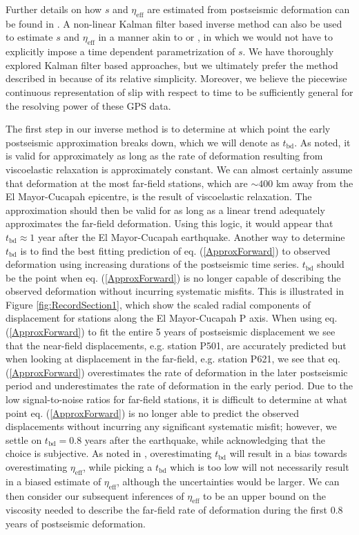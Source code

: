 \documentclass[1p]{elsarticle}
\begin{document}
Further details on how $s$ and $\eta_\mathrm{eff}$ are estimated from postseismic deformation can be found in \citet{Hines2015}. A non-linear Kalman filter based inverse method can also be used to estimate $s$ and $\eta_{\mathrm{eff}}$ in a manner akin to \citet{Segall1997} or \citet{McGuire2003}, in which we would not have to explicitly impose a time dependent parametrization of $s$. We have thoroughly explored Kalman filter based approaches, but we ultimately prefer the method described in \citet{Hines2015} because of its relative simplicity. Moreover, we believe the piecewise continuous representation of slip with respect to time to be sufficiently general for the resolving power of these GPS data.

The first step in our inverse method is to determine at which point the early postseismic approximation breaks down, which we will denote as $t_{\mathrm{bd}}$.  As noted, it is valid for approximately as long as the rate of deformation resulting from viscoelastic relaxation is approximately constant. We can almost certainly assume that deformation at the most far-field stations, which are $\sim400$ km away from the El Mayor-Cucapah epicentre, is the result of viscoelastic relaxation. The approximation should then be valid for as long as a linear trend adequately approximates the far-field deformation. Using this logic, it would appear that $t_{\mathrm{bd}}\approx1$ year after the El Mayor-Cucapah earthquake.  Another way to determine $t_{\mathrm{bd}}$ is to find the best fitting prediction of eq. (\ref{ApproxForward}) to observed deformation using increasing durations of the postseismic time series.  $t_\mathrm{bd}$ should be the point when eq. (\ref{ApproxForward}) is no longer capable of describing the observed deformation without incurring systematic misfits.  This is illustrated in Figure \ref{fig:RecordSection1}, which show the scaled radial components of displacement for stations along the El Mayor-Cucapah P axis.  When using eq. (\ref{ApproxForward}) to fit the entire 5 years of postseismic displacement we see that the near-field displacements, e.g. station P501, are accurately predicted but when looking at displacement in the far-field, e.g. station P621, we see that eq. (\ref{ApproxForward}) overestimates the rate of deformation in the later postseismic period and underestimates the rate of deformation in the early period.  Due to the low signal-to-noise ratios for far-field stations, it is difficult to determine at what point eq. (\ref{ApproxForward}) is no longer able to predict the observed displacements without incurring any significant systematic misfit; however, we settle on $t_{\mathrm{bd}}=0.8$ years after the earthquake, while acknowledging that the choice is subjective. As noted in \citet{Hines2015}, overestimating $t_{\mathrm{bd}}$ will result in a bias towards overestimating $\eta_{\mathrm{eff}}$, while picking a $t_\mathrm{bd}$ which is too low will not necessarily result in a biased estimate of $\eta_\mathrm{eff}$, although the uncertainties would be larger. We can then consider our subsequent inferences of $\eta_{\mathrm{eff}}$ to be an upper bound on the viscosity needed to describe the far-field rate of deformation during the first 0.8 years of postseismic deformation. 
\end{document}

